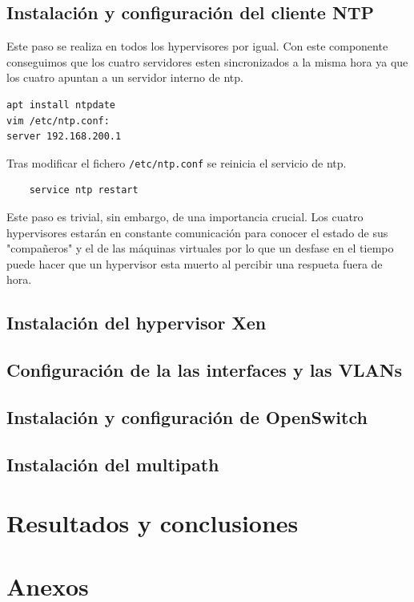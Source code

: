 \documentclass[12pt,a4paper,titlepage,twoside]{report}
\begin{document}
\section{Instalación y configuración del cliente NTP}
Este paso se realiza en todos los hypervisores por igual. Con este componente conseguimos que los cuatro servidores esten sincronizados a la misma hora ya que los cuatro apuntan a un servidor interno de ntp.
\begin{lstlisting}
apt install ntpdate
vim /etc/ntp.conf:
server 192.168.200.1
\end{lstlisting}
Tras modificar el fichero \verb|/etc/ntp.conf| se reinicia el servicio de ntp.
\begin{lstlisting}
	service ntp restart
\end{lstlisting}
Este paso es trivial, sin embargo, de una importancia crucial. Los cuatro hypervisores estarán en constante comunicación para conocer el estado de sus "compañeros" y el de las máquinas virtuales por lo que un desfase en el tiempo puede hacer que un hypervisor esta muerto al percibir una respueta fuera de hora.
\section{Instalación del hypervisor Xen}
\section{Configuración de la las interfaces y las VLANs}
\section{Instalación y configuración de OpenSwitch}
\section{Instalación del multipath}

\chapter{Resultados y conclusiones}
\chapter{Anexos}

\nocite{*}
\printbibliography
\end{document}
